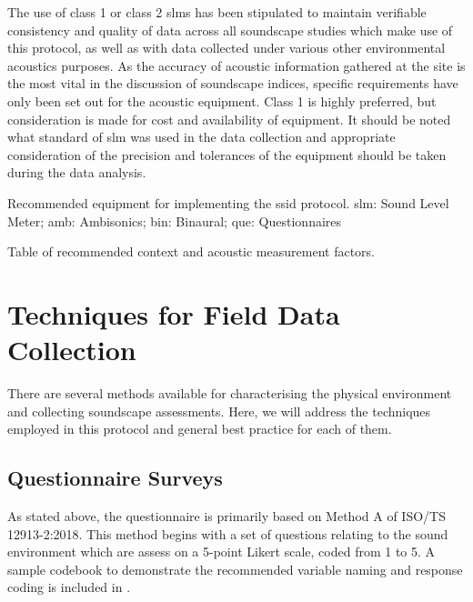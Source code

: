    The use of class 1 or class 2 \gls{slm}s has been stipulated to maintain verifiable consistency and quality of data across all soundscape studies which make use of this protocol, as well as with data collected under various other environmental acoustics purposes. As the accuracy of acoustic information gathered at the site is the most vital in the discussion of soundscape indices, specific requirements have only been set out for the acoustic equipment. Class 1 is highly preferred, but consideration is made for cost and availability of equipment. It should be noted what standard of \gls{slm} was used in the data collection and appropriate consideration of the precision and tolerances of the equipment should be taken during the data analysis.

   \begin{table}
     \label{tab:equipment}
     \caption{Recommended equipment for implementing the \gls{ssid} protocol. \gls{slm}: Sound Level Meter; \gls{amb}: Ambisonics; \gls{bin}: Binaural; \gls{que}: Questionnaires}

   \end{table}

   \begin{table}
     \label{tab:factors}
     \caption{Table of recommended context and acoustic measurement factors.}
   \end{table}


\section{Techniques for Field Data Collection}

 There are several methods available for characterising the physical environment and collecting soundscape assessments. Here, we will address the techniques employed in this protocol and general best practice for each of them.

 \subsection{Questionnaire Surveys}

   As stated above, the questionnaire is primarily based on Method A of ISO/TS 12913-2:2018. This method begins with a set of questions relating to the sound environment which are assess on a 5-point Likert scale, coded from 1 to 5. A sample codebook to demonstrate the recommended variable naming and response coding is included in .


